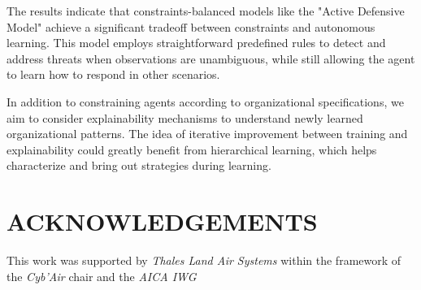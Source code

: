 \documentclass[a4paper,twoside]{article}
\begin{document}
The results indicate that constraints-balanced models like the "Active Defensive Model" achieve a significant tradeoff between constraints and autonomous learning. This model employs straightforward predefined rules to detect and address threats when observations are unambiguous, while still allowing the agent to learn how to respond in other scenarios.

In addition to constraining agents according to organizational specifications, we aim to consider explainability mechanisms to understand newly learned organizational patterns. The idea of iterative improvement between training and explainability could greatly benefit from hierarchical learning, which helps characterize and bring out strategies during learning.




\section*{ACKNOWLEDGEMENTS}

This work was supported by \emph{Thales Land Air Systems} within the framework of the \emph{Cyb'Air} chair and the \emph{AICA IWG}




{\small
}


\end{document}
